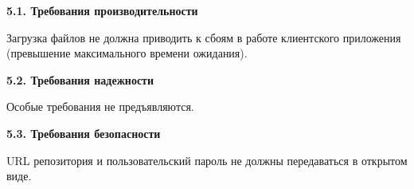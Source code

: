 \documentclass[a4paper,12pt]{article}
\begin{document}
	\textbf{5.1.	Требования производительности}
	
		Загрузка файлов не должна приводить к сбоям в работе клиентского приложения (превышение максимального времени ожидания).
		\newline
		
	\textbf{5.2.	Требования надежности}
	
		Особые требования не предъявляются.
	\newline
	
	\textbf{5.3.	Требования безопасности}
	
		URL репозитория и пользовательский пароль не должны передаваться в открытом виде.
	\newline
\end{document}

